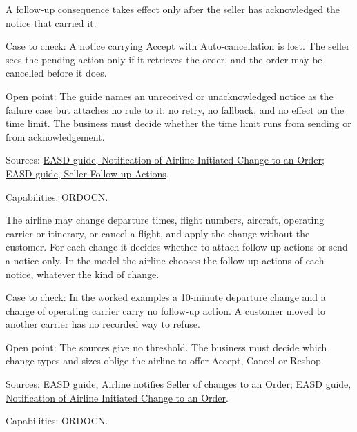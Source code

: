 \begin{theorem}
  \label{thm:airline-change-lost-notice}
  \notready
  A follow-up consequence takes effect only after the seller has
  acknowledged the notice that carried it.

  Case to check: A notice carrying Accept with Auto-cancellation is lost.
  The seller sees the pending action only if it retrieves the order, and the
  order may be cancelled before it does.

  Open point: The guide names an unreceived or unacknowledged notice as the
  failure case but attaches no rule to it: no retry, no fallback, and no
  effect on the time limit. The business must decide whether the time limit
  runs from sending or from acknowledgement.

  Sources: \href{https://standards.atlassian.net/wiki/spaces/EASD/pages/574455903}{EASD guide, Notification of Airline Initiated Change to an Order};
  \href{https://standards.atlassian.net/wiki/spaces/EASD/pages/574849094}{EASD guide, Seller Follow-up Actions}.

  Capabilities: ORDOCN.
\end{theorem}

\begin{definition}
  \label{def:airline-change-change-needs-choice}
  The airline may change departure times, flight numbers, aircraft,
  operating carrier or itinerary, or cancel a flight, and apply the change
  without the customer. For each change it decides whether to attach
  follow-up actions or send a notice only.  In the model the airline chooses
  the follow-up actions of each notice, whatever the kind of change.

  Case to check: In the worked examples a 10-minute departure change and a
  change of operating carrier carry no follow-up action. A customer moved to
  another carrier has no recorded way to refuse.

  Open point: The sources give no threshold. The business must decide which
  change types and sizes oblige the airline to offer Accept, Cancel or
  Reshop.

  Sources: \href{https://standards.atlassian.net/wiki/spaces/EASD/pages/815202352}{EASD guide, Airline notifies Seller of changes to an Order};
  \href{https://standards.atlassian.net/wiki/spaces/EASD/pages/574455903}{EASD guide, Notification of Airline Initiated Change to an Order}.

  Capabilities: ORDOCN.
\end{definition}

